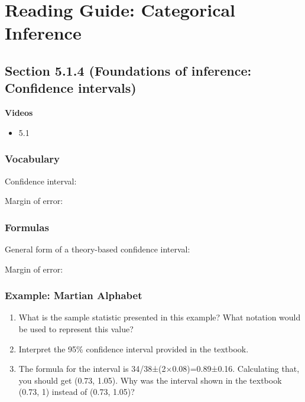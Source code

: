 \documentclass[
]{report}
\providecommand{\tightlist}{%
  \setlength{\itemsep}{0pt}\setlength{\parskip}{0pt}}
\newcommand{\rgs}{\vspace{12pt}} %
\begin{document}
\hypertarget{reading-guide-categorical-inference-1}{%
\section{Reading Guide: Categorical Inference}\label{reading-guide-categorical-inference-1}}

\hypertarget{section-5.1.4-foundations-of-inference-confidence-intervals}{%
\subsection{Section 5.1.4 (Foundations of inference: Confidence intervals)}\label{section-5.1.4-foundations-of-inference-confidence-intervals}}

\textbf{Videos}

\begin{itemize}
\tightlist
\item
  5.1
\end{itemize}


\hypertarget{vocabulary-13}{%
\subsubsection*{Vocabulary}\label{vocabulary-13}}

Confidence interval:
\rgs

Margin of error:
\rgs

\hypertarget{formulas-3}{%
\subsubsection*{Formulas}\label{formulas-3}}

General form of a theory-based confidence interval:
\rgs

Margin of error:
\rgs

\hypertarget{example-martian-alphabet-1}{%
\subsubsection*{Example: Martian Alphabet}\label{example-martian-alphabet-1}}

\begin{enumerate}
\def\labelenumi{\arabic{enumi}.}
\item
  What is the sample statistic presented in this example? What notation would be used to represent this value?
  \rgs
\item
  Interpret the 95\% confidence interval provided in the textbook.
  \rgs
\item
  The formula for the interval is 34/38±(2×0.08)=0.89±0.16. Calculating that, you should get (0.73, 1.05). Why was the interval shown in the textbook (0.73, 1) instead of (0.73, 1.05)?
  \rgs
\end{enumerate}
\end{document}
